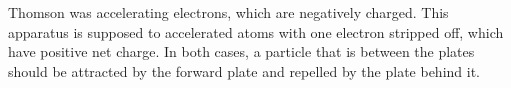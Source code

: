 Thomson was accelerating electrons, which are negatively
charged. This apparatus is supposed to accelerated atoms with one electron stripped off,
which have positive net charge. In both cases, a particle that is between the plates
should be attracted by the forward plate and repelled by the plate behind it.



